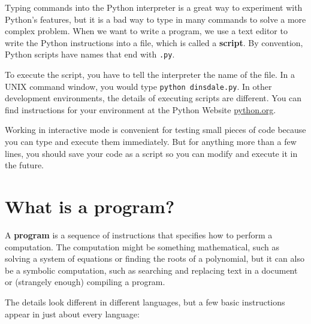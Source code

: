 \documentclass[10pt]{book}
\begin{document}

Typing commands into the Python interpreter is a great way to experiment
with Python's features, but it is a bad way to type in many commands 
to solve a more complex problem.  When we want to write a program, 
we use a text editor to write the Python instructions into a file,
which is called a {\bf script}.  By
convention, Python scripts have names that end with {\tt .py}.


To execute the script, you have to tell the interpreter the name of
the file.  In a UNIX command window, you would type {\tt python
dinsdale.py}.  In other development environments, the details of
executing scripts are different.  You can find instructions for
your environment at the Python Website \url{python.org}.


Working in interactive mode is convenient for testing small pieces of
code because you can type and execute them immediately.  But for
anything more than a few lines, you should save your code
as a script so you can modify and execute it in the future.


\section{What is a program?}

A {\bf program} is a sequence of instructions that specifies how to
perform a computation.  The computation might be something
mathematical, such as solving a system of equations or finding the
roots of a polynomial, but it can also be a symbolic computation, such
as searching and replacing text in a document or (strangely enough)
compiling a program.


The details look different in different languages, but a few basic
instructions appear in just about every language:
\end{document}
